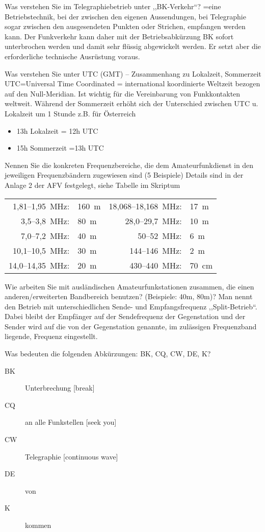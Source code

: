 \documentclass[avery5371,grid,frame,a4paper]{flashcards}
\newcommand{\card}[3]{
  \begin{flashcard}[{\chap} -- #1]{#2}#3\end{flashcard}
}
\begin{document}
\card{38}{Was verstehen Sie im Telegraphiebetrieb unter ,,BK-Verkehr``?}{
  =eine Betriebstechnik, bei der zwischen den eigenen Aussendungen, bei Telegraphie sogar zwischen den ausgesendeten Punkten oder Strichen, empfangen werden kann. Der Funkverkehr kann daher mit der Betriebsabkürzung BK sofort unterbrochen werden und damit sehr flüssig abgewickelt werden. Er setzt aber die erforderliche technische Ausrüstung voraus.
}
\card{39}{Was verstehen Sie unter UTC (GMT) -- Zusammenhang zu Lokalzeit, Sommerzeit}{
  UTC=Universal Time Coordinated = international koordinierte Weltzeit bezogen auf den Null-Meridian. Ist wichtig für die Vereinbarung von Funkkontakten weltweit. Während der Sommerzeit erhöht sich der Unterschied zwischen UTC u. Lokalzeit um 1 Stunde  z.B. für Österreich
  \begin{itemize}
    \item 13h Lokalzeit = 12h UTC
    \item  15h Sommerzeit =13h UTC
  \end{itemize}
}
\card{40}{Nennen Sie die konkreten Frequenzbereiche, die dem Amateurfunkdienst in den jeweiligen Frequenzbändern zugewiesen sind (5 Beispiele)}{
  \small
  Details sind in der Anlage 2 der AFV festgelegt, siehe Tabelle im Skriptum

  \vspace{30pt}
  \footnotesize
  \begin{tabular}{rlrl}
    1,81--1,95~MHz: & 160~m & 18,068--18,168~MHz: & 17~m \\
    3,5--3,8~MHz: & 80~m & 28,0--29,7~MHz: & 10~m \\
    7,0--7,2~MHz: & 40~m & 50--52~MHz: & 6~m \\
    10,1--10,5~MHz: & 30~m & 144--146~MHz: & 2~m \\
    14,0--14,35~MHz: & 20~m & 430--440~MHz: & 70~cm \\
  \end{tabular}
}
\card{41}{Wie arbeiten Sie mit ausländischen Amateurfunkstationen zusammen, die einen anderen/erweiterten Bandbereich benutzen? (Beispiele: 40m, 80m)?}{
  Man nennt den Betrieb mit unterschiedlichen Sende- und Empfangsfrequenz ,,Split-Betrieb``. Dabei bleibt der Empfänger auf der Sendefrequenz der Gegenstation und der Sender wird auf die von der Gegenstation genannte, im zulässigen Frequenzband liegende, Frequenz eingestellt.
}
\card{42}{Was bedeuten die folgenden Abkürzungen: BK, CQ, CW, DE, K?}{
  \begin{description}
    \item[BK] Unterbrechung [break]
    \item[CQ] an alle Funkstellen [seek you]
    \item[CW] Telegraphie [continuous wave]
    \item[DE] von
    \item[K] kommen
  \end{description}
}
\end{document}
